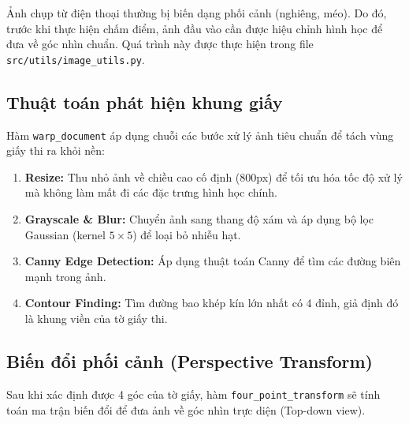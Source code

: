 \documentclass[6pt, a4paper]{report}
\begin{document}
	Ảnh chụp từ điện thoại thường bị biến dạng phối cảnh (nghiêng, méo). Do đó, trước khi thực hiện chấm điểm, ảnh đầu vào cần được hiệu chỉnh hình học để đưa về góc nhìn chuẩn. Quá trình này được thực hiện trong file \texttt{src/utils/image\_utils.py}.
	
	\subsection{Thuật toán phát hiện khung giấy}
	Hàm \texttt{warp\_document} áp dụng chuỗi các bước xử lý ảnh tiêu chuẩn để tách vùng giấy thi ra khỏi nền:
	
	\begin{enumerate}
		\item \textbf{Resize:} Thu nhỏ ảnh về chiều cao cố định (800px) để tối ưu hóa tốc độ xử lý mà không làm mất đi các đặc trưng hình học chính.
		\item \textbf{Grayscale \& Blur:} Chuyển ảnh sang thang độ xám và áp dụng bộ lọc Gaussian (kernel $5 \times 5$) để loại bỏ nhiễu hạt.
		\item \textbf{Canny Edge Detection:} Áp dụng thuật toán Canny để tìm các đường biên mạnh trong ảnh.
		\item \textbf{Contour Finding:} Tìm đường bao khép kín lớn nhất có 4 đỉnh, giả định đó là khung viền của tờ giấy thi.
	\end{enumerate}
	
	\subsection{Biến đổi phối cảnh (Perspective Transform)}
	Sau khi xác định được 4 góc của tờ giấy, hàm \texttt{four\_point\_transform} sẽ tính toán ma trận biến đổi để đưa ảnh về góc nhìn trực diện (Top-down view).
	
\end{document}
